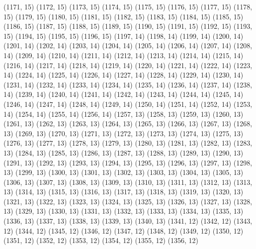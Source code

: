 {   (1171, 15)
   (1172, 15)
   (1173, 15)
   (1174, 15)
   (1175, 15)
   (1176, 15)
   (1177, 15)
   (1178, 15)
   (1179, 15)
   (1180, 15)
   (1181, 15)
   (1182, 15)
   (1183, 15)
   (1184, 15)
   (1185, 15)
   (1186, 15)
   (1187, 15)
   (1188, 15)
   (1189, 15)
   (1190, 15)
   (1191, 15)
   (1192, 15)
   (1193, 15)
   (1194, 15)
   (1195, 15)
   (1196, 15)
   (1197, 14)
   (1198, 14)
   (1199, 14)
   (1200, 14)
   (1201, 14)
   (1202, 14)
   (1203, 14)
   (1204, 14)
   (1205, 14)
   (1206, 14)
   (1207, 14)
   (1208, 14)
   (1209, 14)
   (1210, 14)
   (1211, 14)
   (1212, 14)
   (1213, 14)
   (1214, 14)
   (1215, 14)
   (1216, 14)
   (1217, 14)
   (1218, 14)
   (1219, 14)
   (1220, 14)
   (1221, 14)
   (1222, 14)
   (1223, 14)
   (1224, 14)
   (1225, 14)
   (1226, 14)
   (1227, 14)
   (1228, 14)
   (1229, 14)
   (1230, 14)
   (1231, 14)
   (1232, 14)
   (1233, 14)
   (1234, 14)
   (1235, 14)
   (1236, 14)
   (1237, 14)
   (1238, 14)
   (1239, 14)
   (1240, 14)
   (1241, 14)
   (1242, 14)
   (1243, 14)
   (1244, 14)
   (1245, 14)
   (1246, 14)
   (1247, 14)
   (1248, 14)
   (1249, 14)
   (1250, 14)
   (1251, 14)
   (1252, 14)
   (1253, 14)
   (1254, 14)
   (1255, 14)
   (1256, 14)
   (1257, 13)
   (1258, 13)
   (1259, 13)
   (1260, 13)
   (1261, 13)
   (1262, 13)
   (1263, 13)
   (1264, 13)
   (1265, 13)
   (1266, 13)
   (1267, 13)
   (1268, 13)
   (1269, 13)
   (1270, 13)
   (1271, 13)
   (1272, 13)
   (1273, 13)
   (1274, 13)
   (1275, 13)
   (1276, 13)
   (1277, 13)
   (1278, 13)
   (1279, 13)
   (1280, 13)
   (1281, 13)
   (1282, 13)
   (1283, 13)
   (1284, 13)
   (1285, 13)
   (1286, 13)
   (1287, 13)
   (1288, 13)
   (1289, 13)
   (1290, 13)
   (1291, 13)
   (1292, 13)
   (1293, 13)
   (1294, 13)
   (1295, 13)
   (1296, 13)
   (1297, 13)
   (1298, 13)
   (1299, 13)
   (1300, 13)
   (1301, 13)
   (1302, 13)
   (1303, 13)
   (1304, 13)
   (1305, 13)
   (1306, 13)
   (1307, 13)
   (1308, 13)
   (1309, 13)
   (1310, 13)
   (1311, 13)
   (1312, 13)
   (1313, 13)
   (1314, 13)
   (1315, 13)
   (1316, 13)
   (1317, 13)
   (1318, 13)
   (1319, 13)
   (1320, 13)
   (1321, 13)
   (1322, 13)
   (1323, 13)
   (1324, 13)
   (1325, 13)
   (1326, 13)
   (1327, 13)
   (1328, 13)
   (1329, 13)
   (1330, 13)
   (1331, 13)
   (1332, 13)
   (1333, 13)
   (1334, 13)
   (1335, 13)
   (1336, 13)
   (1337, 13)
   (1338, 13)
   (1339, 13)
   (1340, 13)
   (1341, 12)
   (1342, 12)
   (1343, 12)
   (1344, 12)
   (1345, 12)
   (1346, 12)
   (1347, 12)
   (1348, 12)
   (1349, 12)
   (1350, 12)
   (1351, 12)
   (1352, 12)
   (1353, 12)
   (1354, 12)
   (1355, 12)
   (1356, 12)
}
